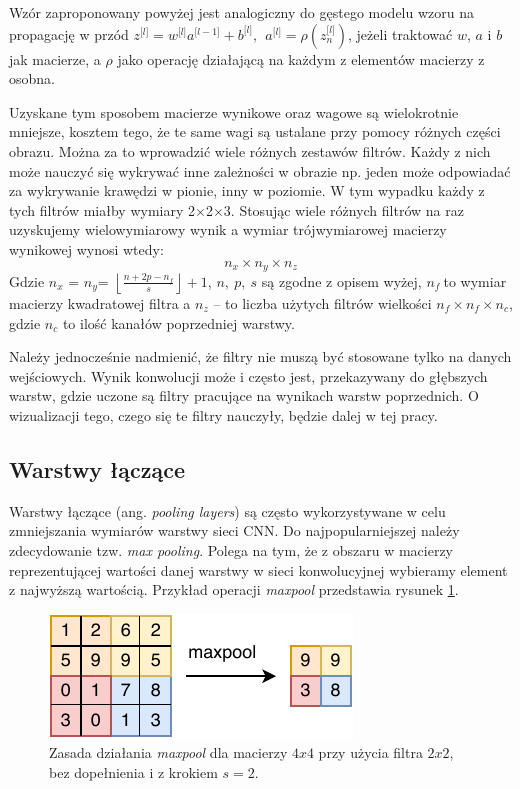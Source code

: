 Wzór zaproponowany powyżej jest analogiczny do gęstego modelu wzoru na
propagację w przód \(z^{\lbrack l\rbrack} = w^{\lbrack l\rbrack}a^{\lbrack l - 1\rbrack} + b^{\lbrack l\rbrack},\ \ a^{\lbrack l\rbrack} = \rho(z_{n}^{\lbrack l\rbrack})\), jeżeli traktować \(w\), \(a\) i \(b\) jak macierze, a \(\rho\) jako operację działającą na każdym z elementów macierzy z osobna.

Uzyskane tym sposobem macierze wynikowe oraz wagowe są wielokrotnie mniejsze, kosztem tego, że te same wagi są ustalane przy pomocy różnych części obrazu. Można za to wprowadzić wiele różnych zestawów filtrów. Każdy z nich może nauczyć się wykrywać inne zależności w obrazie np. jeden może odpowiadać za wykrywanie krawędzi w pionie, inny w poziomie. W tym wypadku każdy z tych filtrów miałby wymiary 2\(\times\)2\(\times\)3. Stosując wiele różnych filtrów na raz uzyskujemy wielowymiarowy wynik
a wymiar trójwymiarowej macierzy wynikowej wynosi wtedy:
\[n_{x} \times n_{y} \times n_{z}\]
Gdzie \(n_{x}\) = ­­\(n_{y}\)=
\(\left\lfloor \frac{n + 2p - n_{f}}{s} \right\rfloor + 1\), \(n,\ p,\ s\)
są zgodne z opisem wyżej, \(n_{f}\ \)to wymiar macierzy kwadratowej
filtra a \(n_{z}\) -- to liczba użytych filtrów wielkości
\(n_{f} \times n_{f} \times n_{c}\), gdzie \(n_{c}\) to ilość kanałów poprzedniej warstwy.

Należy jednocześnie nadmienić, że filtry nie muszą być stosowane tylko na danych wejściowych. Wynik konwolucji może i często jest, przekazywany do głębszych warstw, gdzie uczone są filtry pracujące na wynikach warstw poprzednich. O wizualizacji tego, czego się te filtry nauczyły, będzie dalej w tej pracy.

\subsection{Warstwy łączące}

Warstwy łączące (ang. \textit{pooling layers}) są często wykorzystywane w celu zmniejszania wymiarów warstwy sieci CNN. Do najpopularniejszej należy zdecydowanie tzw. \textit{max pooling}. Polega na tym, że z obszaru w macierzy reprezentującej wartości danej warstwy w sieci konwolucyjnej wybieramy element z najwyższą wartością. Przykład operacji \textit{maxpool} przedstawia rysunek \ref{fig:maxpool}.

\begin{figure}[ht]
\centerline{\includegraphics[scale=1]{resources/cnn/maxpool.pdf}}
\caption{Zasada działania \textit{maxpool} dla macierzy \(4x4\) przy użycia filtra \(2x2\), bez dopełnienia i z krokiem \(s = 2\).}
\label{fig:maxpool}
\end{figure}

